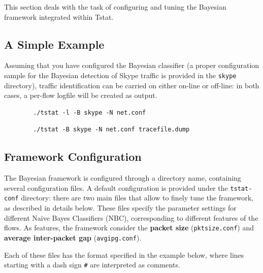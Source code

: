 \documentclass[11pt]{article}
\begin{document}
This section deals with the task of configuring and tuning the 
Bayesian framework integrated within Tstat.

\subsection{A Simple Example\label{A_Simple_Example}}


Assuming that you have configured the Bayesian classifier (a proper configuration sample 
for the Bayesian detection of Skype traffic is provided in the \texttt{skype} directory), 
traffic identification can be carried on either on-line or off-line: in both cases, 
a per-flow logfile will be created as output.

\begin{small}\begin{verbatim}
        ./tstat -l -B skype -N net.conf
\end{verbatim}\end{small} \noindent
\begin{small}\begin{verbatim}
        ./tstat -B skype -N net.conf tracefile.dump
\end{verbatim}\end{small} \noindent
\subsection{Framework Configuration\label{Framework_Configuration}}


The Bayesian framework is configured through a directory name, 
containing several configuration files. A default configuration
is provided under the \texttt{tstat-conf} directory: 
there are two main files that allow to finely tune the framework, 
as described in details below.
These files specify the parameter settings for different 
Naive Bayes Classifiers (NBC), corresponding to different features 
of the flows. As features, the framework consider 
the \textbf{packet size} (\texttt{pktsize.conf}) and \textbf{average inter-packet gap}
(\texttt{avgipg.conf}).



Each of these files has the format specified in the example below, where lines 
starting with a dash sign \texttt{\#} are interpreted as comments.
\end{document}
